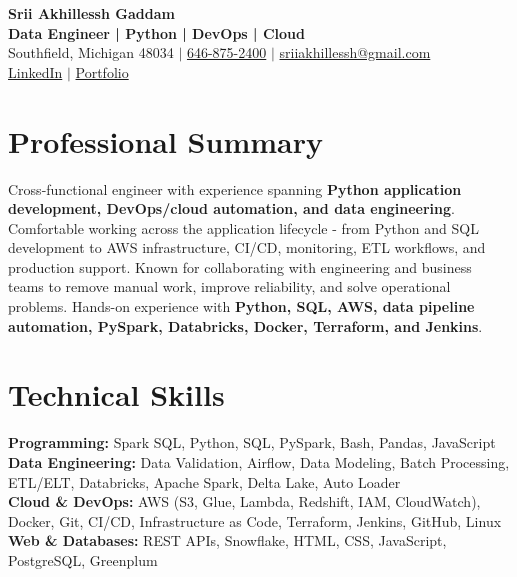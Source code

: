 \documentclass[letterpaper,10pt]{article}
\begin{document}
\fontsize{9.35pt}{10.45pt}\selectfont

\begin{center}
    {\LARGE \textbf{Srii Akhillessh Gaddam}} \\[-1pt]
    \textbf{Data Engineer | Python | DevOps | Cloud} \\[2pt]
    Southfield, Michigan 48034 $|$
    \href{tel:6468752400}{646-875-2400} $|$
    \href{mailto:sriiakhillessh@gmail.com}{sriiakhillessh@gmail.com} \\[1pt]
    \href{https://www.linkedin.com/in/srii-akhiilessh-gaddam-b48668191/}{LinkedIn} $|$
    \href{https://sriiakhillesshg.github.io/portfolio/}{Portfolio}
\end{center}
\vspace{-8pt}

\section{Professional Summary}
\small{Cross-functional engineer with experience spanning \textbf{Python application development, DevOps/cloud automation, and data engineering}. Comfortable working across the application lifecycle - from Python and SQL development to AWS infrastructure, CI/CD, monitoring, ETL workflows, and production support. Known for collaborating with engineering and business teams to remove manual work, improve reliability, and solve operational problems. Hands-on experience with \textbf{Python, SQL, AWS, data pipeline automation, PySpark, Databricks, Docker, Terraform, and Jenkins}.}

\section{Technical Skills}
\small{
\textbf{Programming:} Spark SQL, Python, SQL, PySpark, Bash, Pandas, JavaScript \\
\textbf{Data Engineering:} Data Validation, Airflow, Data Modeling, Batch Processing, ETL/ELT, Databricks, Apache Spark, Delta Lake, Auto Loader \\
\textbf{Cloud \& DevOps:} AWS (S3, Glue, Lambda, Redshift, IAM, CloudWatch), Docker, Git, CI/CD, Infrastructure as Code, Terraform, Jenkins, GitHub, Linux \\
\textbf{Web \& Databases:} REST APIs, Snowflake, HTML, CSS, JavaScript, PostgreSQL, Greenplum
}
\end{document}
